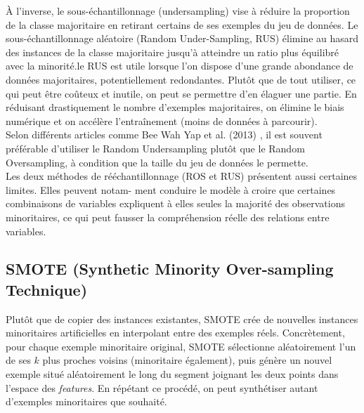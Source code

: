 \documentclass{article}
\begin{document}
À l’inverse, le sous-échantillonnage (undersampling) vise à réduire la proportion de la classe
majoritaire en retirant certains de ses exemples du jeu de données. Le sous-échantillonnage aléatoire
(Random Under-Sampling, RUS) élimine au hasard des instances de la classe majoritaire jusqu’à atteindre
un ratio plus équilibré avec la minorité.le RUS est utile lorsque l’on dispose d’une grande abondance de
données majoritaires, potentiellement redondantes. Plutôt que de tout utiliser, ce qui peut être
coûteux et inutile, on peut se permettre d’en élaguer une partie. En réduisant drastiquement le nombre
d’exemples majoritaires, on élimine le biais numérique et on accélère l’entraînement (moins de
données à parcourir).
\\

Selon différents articles comme Bee Wah Yap et al. (2013) \cite{MerwanC}, il est souvent préférable d’utiliser le Random Undersampling plutôt que le Random Oversampling, à condition que la taille du jeu de données le permette.
\\

Les deux méthodes de rééchantillonnage (ROS et RUS) présentent aussi certaines limites. Elles peuvent notam-
ment conduire le modèle à croire que certaines combinaisons de variables expliquent à
elles seules la majorité des observations minoritaires, ce qui peut fausser la compréhension
réelle des relations entre variables.

\subsection{SMOTE (Synthetic Minority Over-sampling Technique)}

Plutôt que de copier des instances existantes,
SMOTE crée de nouvelles instances minoritaires artificielles en interpolant entre des exemples réels. Concrètement, pour chaque exemple minoritaire original, SMOTE sélectionne aléatoirement l’un de ses
$k$ plus proches voisins (minoritaire également), puis génère un nouvel exemple situé aléatoirement le
long du segment joignant les deux points dans l’espace des \textit{features}. En répétant ce procédé, on
peut synthétiser autant d’exemples minoritaires que souhaité.
\\
\end{document}

